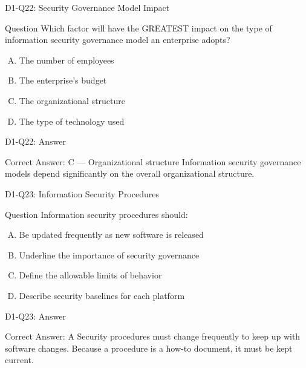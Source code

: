 \documentclass{beamer}
\begin{document}
	\begin{frame}{D1-Q22: Security Governance Model Impact}
		\begin{block}{Question}
			Which factor will have the GREATEST impact on the type of information security governance model an enterprise adopts?
		\end{block}
		\begin{enumerate}[(A)]
			\item The number of employees
			\item The enterprise's budget
			\item The organizational structure
			\item The type of technology used
		\end{enumerate}
	\end{frame}
	\begin{frame}{D1-Q22: Answer}
		\begin{block}{Correct Answer: C --- Organizational structure}
			Information security governance models depend significantly on the overall organizational structure.
		\end{block}
	\end{frame}
	
	\begin{frame}{D1-Q23: Information Security Procedures}
		\begin{block}{Question}
			Information security procedures should:
		\end{block}
		\begin{enumerate}[(A)]
			\item Be updated frequently as new software is released
			\item Underline the importance of security governance
			\item Define the allowable limits of behavior
			\item Describe security baselines for each platform
		\end{enumerate}
	\end{frame}
	\begin{frame}{D1-Q23: Answer}
		\begin{block}{Correct Answer: A}
			Security procedures must change frequently to keep up with software changes. Because a procedure is a how-to document, it must be kept current.
		\end{block}
	\end{frame}
	
\end{document}
